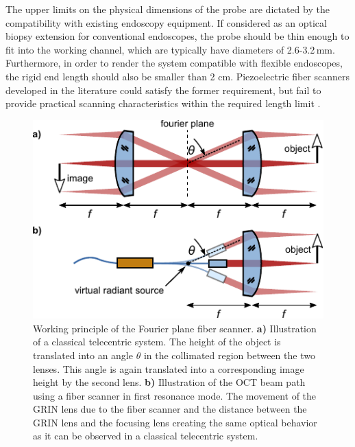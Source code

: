 \documentclass[10pt]{iopart}
\begin{document}
The upper limits on the physical dimensions of the probe are dictated by the compatibility with existing endoscopy equipment. If considered as an optical biopsy extension for conventional endoscopes, the probe should be thin enough to fit into the working channel, which are typically have diameters of 2.6-3.2\,mm. Furthermore, in order to render the system compatible with flexible endoscopes, the rigid end length should also be smaller than 2 cm. Piezoelectric fiber scanners developed in the literature could satisfy the former requirement, but fail to provide practical scanning characteristics within the required length limit \cite{}.

\begin{figure}[h]\centering \includegraphics[width=\columnwidth]{figures/fps2.pdf}
      \caption{Working principle of the Fourier plane fiber scanner.
      \textbf{a)} Illustration of a classical telecentric system. The height of the object is translated into an angle $\theta$ in the collimated region between the two lenses. This angle is again translated into a corresponding image height by the second lens. \textbf{b)} Illustration of the OCT beam path using a fiber scanner in first resonance mode. The movement of the GRIN lens due to the fiber scanner and the distance between the GRIN lens and the focusing lens creating the same optical behavior as it can be observed in a classical telecentric system.}
      \label{fig:fps}
\end{figure}
\end{document}
